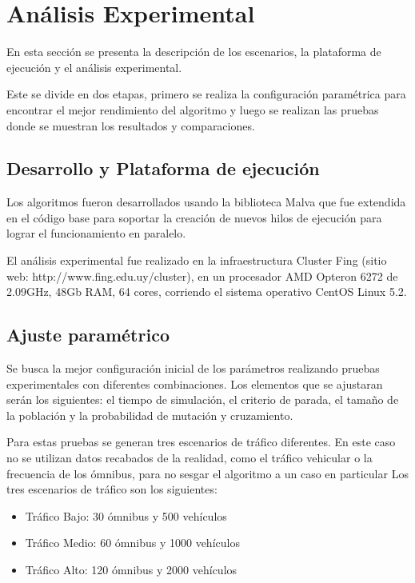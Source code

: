\chapter{Análisis Experimental}
En esta sección se presenta la descripción de los escenarios, la plataforma de ejecución y el análisis experimental.

Este se divide en dos etapas, primero se realiza la configuración paramétrica para encontrar el mejor rendimiento del algoritmo y luego se realizan las pruebas donde se muestran los resultados y comparaciones.


\section{Desarrollo y Plataforma de ejecución }
Los algoritmos fueron desarrollados usando la biblioteca Malva que fue extendida en el código base para soportar la creación de nuevos hilos de ejecución para lograr el funcionamiento en paralelo.

El análisis experimental fue realizado en la infraestructura Cluster Fing (sitio web: http://www.fing.edu.uy/cluster), en un procesador AMD Opteron 6272 de 2.09GHz, 48Gb RAM, 64 cores, corriendo el sistema operativo CentOS Linux 5.2.


\section{Ajuste paramétrico}
Se busca la mejor configuración inicial de los parámetros realizando pruebas experimentales con diferentes combinaciones. Los elementos que se ajustaran serán los siguientes: el tiempo de simulación, el criterio de parada, el tamaño de la población y la probabilidad de mutación y cruzamiento.

Para estas pruebas se generan tres escenarios de tráfico diferentes. En este caso no se utilizan datos recabados de la realidad, como el tráfico vehicular o la frecuencia de los ómnibus, para no sesgar el algoritmo a un caso en particular
Los tres escenarios de tráfico son los siguientes:

\begin{itemize}
	\item Tráfico Bajo: 30 ómnibus y 500 vehículos	
	\item Tráfico Medio: 60 ómnibus y 1000 vehículos
	\item Tráfico Alto: 120 ómnibus y 2000 vehículos
\end{itemize}


